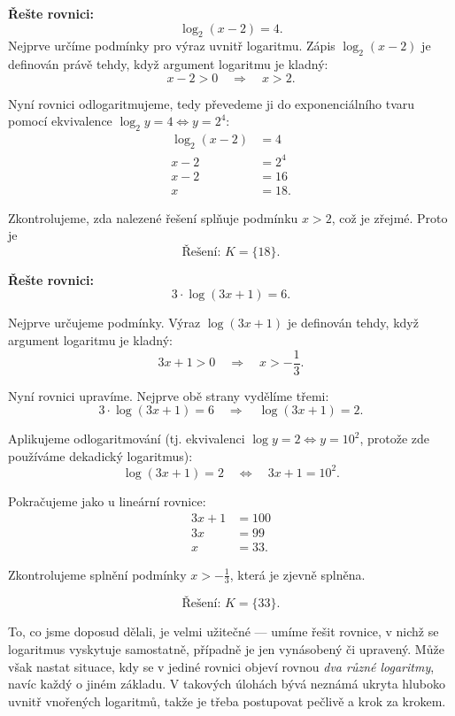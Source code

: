 \documentclass[12pt,a4paper]{article}
\begin{document}
\begin{examplebox}
\textbf{Řešte rovnici:}
\[
\log_2(x-2) = 4.
\]
Nejprve určíme podmínky pro výraz uvnitř logaritmu. Zápis $\log_2(x-2)$ je definován
právě tehdy, když argument logaritmu je kladný:
\[
x - 2 > 0 \quad\Longrightarrow\quad x > 2.
\]

Nyní rovnici odlogaritmujeme, tedy převedeme ji do exponenciálního tvaru pomocí
ekvivalence $\log_2 y = 4 \Longleftrightarrow y = 2^4$:
\begin{align*}
\log_2(x-2) &= 4 \\
x - 2 &= 2^4 \\
x - 2 &= 16 \\
x &= 18.
\end{align*}

Zkontrolujeme, zda nalezené řešení splňuje podmínku $x>2$, což je zřejmé. Proto je
\[
\text{Řešení: } K= \{18\}.
\]
\end{examplebox}

\begin{examplebox}
\textbf{Řešte rovnici:}
\[
3 \cdot \log(3x+1) = 6.
\]


Nejprve určujeme podmínky. Výraz $\log(3x+1)$ je definován tehdy, když argument
logaritmu je kladný:
\[
3x + 1 > 0 \quad\Longrightarrow\quad x > -\frac{1}{3}.
\]

Nyní rovnici upravíme. Nejprve obě strany vydělíme třemi:
\[
3 \cdot \log(3x+1) = 6
\quad\Longrightarrow\quad
\log(3x+1) = 2.
\]

Aplikujeme odlogaritmování (tj. ekvivalenci $\log y = 2 \Longleftrightarrow y = 10^2$,
protože zde používáme dekadický logaritmus):
\[
\log(3x+1) = 2
\quad\Longleftrightarrow\quad
3x + 1 = 10^{2}.
\]

Pokračujeme jako u lineární rovnice:
\begin{align*}
3x + 1 &= 100 \\
3x &= 99 \\
x &= 33.
\end{align*}

Zkontrolujeme splnění podmínky $x > -\tfrac{1}{3}$, která je zjevně splněna.

\[
\text{Řešení: } K = \{33\}.
\]
\end{examplebox}

To, co jsme doposud dělali, je velmi užitečné — umíme řešit rovnice, v nichž se
logaritmus vyskytuje samostatně, případně je jen vynásobený či upravený. Může však
nastat situace, kdy se v jediné rovnici objeví rovnou \emph{dva různé logaritmy},
navíc každý o jiném základu. V takových úlohách bývá neznámá ukryta hluboko
uvnitř vnořených logaritmů, takže je třeba postupovat pečlivě a krok za krokem.
\end{document}
